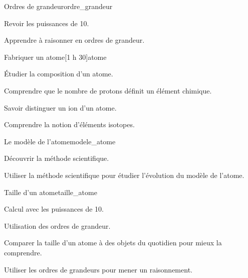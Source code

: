 \begin{multicols}{2}
  \phantom{\methode}\vspace*{-64pt}
  \begin{activite}{Ordres de grandeur}{ordre_grandeur}
    \begin{objectifs}  
      \item Revoir les puissances de 10.
      \item Apprendre à raisonner en ordres de grandeur.
    \end{objectifs}
  \end{activite}

  \phantom{\sndAtom}\vspace*{-44pt}
  \begin{TP}{Fabriquer un atome}[1 h 30]{atome}
    \begin{objectifs}
      \item Étudier la composition d'un atome.
      \item Comprendre que le nombre de protons définit un élément chimique.
      \item Savoir distinguer un ion d'un atome.
      \item Comprendre la notion d'éléments isotopes.
    \end{objectifs}
  \end{TP}
  
  \begin{TP}{Le modèle de l'atome}{modele_atome}
    \begin{objectifs}
        \item Découvrir la méthode scientifique.
        \item Utiliser la méthode scientifique pour étudier l'évolution du modèle de l'atome.
    \end{objectifs}
  \end{TP}
  
  \begin{activite}{Taille d'un atome}{taille_atome}
    \begin{prerequis}
      \item Calcul avec les puissances de 10.
      \item Utilisation des ordres de grandeur.
    \end{prerequis}
    \begin{objectifs}
      \item Comparer la taille d'un atome à des objets du quotidien pour mieux la comprendre.
      \item Utiliser les ordres de grandeurs pour mener un raisonnement.
    \end{objectifs}
  \end{activite}
\end{multicols}

